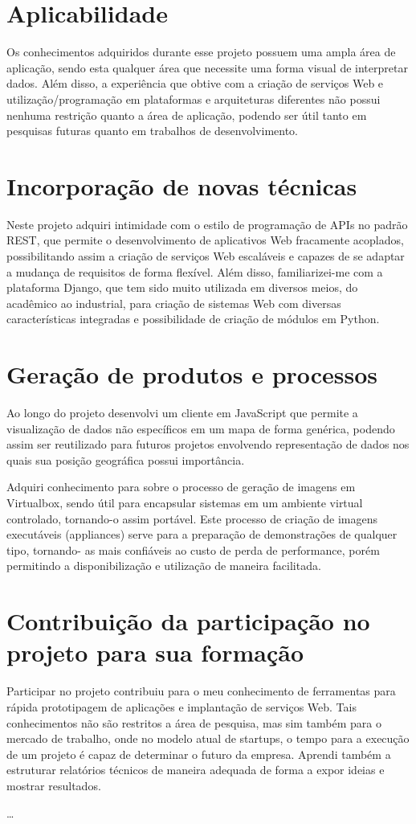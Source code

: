 \documentclass[Portuguese]
{ic-tese-v2}
\begin{document}
\section{Aplicabilidade}
Os conhecimentos adquiridos durante esse projeto possuem uma ampla área de aplicação, sendo esta qualquer área que necessite uma forma visual de interpretar dados. Além disso, a experiência que obtive com a criação de serviços Web e utilização/programação em plataformas e arquiteturas diferentes não possui nenhuma restrição quanto a área de aplicação, podendo ser útil tanto em pesquisas futuras quanto em trabalhos de desenvolvimento.

\section{Incorporação de novas técnicas}
Neste projeto adquiri intimidade com o estilo de programação de APIs no padrão REST, que permite o desenvolvimento de aplicativos Web fracamente acoplados, possibilitando assim a criação de serviços Web escaláveis e capazes de se adaptar a mudança de requisitos de forma flexível. Além disso, familiarizei-me com a plataforma Django, que tem sido muito utilizada em diversos meios, do acadêmico ao industrial, para criação de sistemas Web com diversas características integradas e possibilidade de criação de módulos em Python.

\section{Geração de produtos e processos}
Ao longo do projeto desenvolvi um cliente em JavaScript que permite a visualização de dados não específicos em um mapa de forma genérica, podendo assim ser reutilizado para futuros projetos envolvendo representação de dados nos quais sua posição geográfica possui importância.

Adquiri conhecimento para sobre o processo de geração de imagens em Virtualbox, sendo útil para encapsular sistemas em um ambiente virtual controlado, tornando-o assim portável. Este processo de criação de imagens executáveis (appliances) serve para a preparação de demonstrações de qualquer tipo, tornando- as mais confiáveis ao custo de perda de performance, porém permitindo a disponibilização e utilização de maneira facilitada.

\section{Contribuição da participação no projeto para sua formação}
Participar no projeto contribuiu para o meu conhecimento de ferramentas para rápida prototipagem de aplicações e implantação de serviços Web. Tais conhecimentos não são restritos a área de pesquisa, mas sim também para o mercado de trabalho, onde no modelo atual de startups, o tempo para a execução de um projeto é capaz de determinar o futuro da empresa. Aprendi também a estruturar relatórios técnicos de maneira adequada de forma a expor ideias e mostrar resultados.




\ldots
\end{document}
